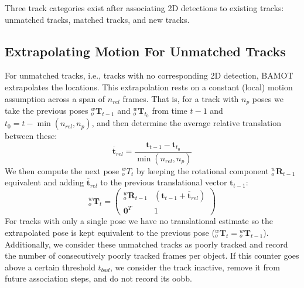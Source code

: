 \documentclass[headsepline, hidelinks, footsepline, footinclude=false, oneside, fontsize=11pt, paper=a4, listof=totoc, bibliography=totoc]{scrbook}
\begin{document}
Three track categories exist after associating 2D detections to existing tracks: unmatched tracks, matched tracks, and new tracks.

\subsection{Extrapolating Motion For Unmatched Tracks}
\label{sec:org9bb640c}
    For unmatched tracks, i.e., tracks with no corresponding 2D detection, BAMOT extrapolates the locations. This extrapolation rests on a constant (local) motion assumption across a span of \(n_{rel}\) frames.
That is, for a track with \(n_p\) poses we take the previous poses \({}^{w}_{o}\mathbf{T}_{t-1}\) and \({}^{w}_{o}\mathbf{T}_{t_0}\) from time \(t - 1\) and \(t_0 = t - \min(n_{rel}, n_p)\), and then determine the average relative translation between these:
\begin{equation}
\overline{\mathbf{t}}_{rel} = \frac{\mathbf{t}_{t-1} - \mathbf{t}_{t_0}}{\min(n_{rel}, n_p)}
\end{equation}
We then compute the next pose \({}^{w}_{o}T_t\) by keeping the rotational component \({}^{w}_{o}\mathbf{R}_{t-1}\) equivalent and adding \(\overline{\mathbf{t}}_{rel}\) 
to the previous translational vector \(\mathbf{t}_{t-1}\):
\begin{equation}
{}^{w}_{o}\mathbf{T}_t = \begin{pmatrix}{}^{w}_{o}\mathbf{R}_{t-1} & (\mathbf{t}_{t-1} + \overline{\mathbf{t}}_{rel}) \\ \mathbf{0}^T & 1 \end{pmatrix}
\end{equation}
For tracks with only a single pose we have no translational estimate so the extrapolated pose is kept equivalent to the previous pose (\({}^{w}_{o}\mathbf{T}_t={}^{w}_{o}\mathbf{T}_{t-1}\)).
Additionally, we consider these unmatched tracks as poorly tracked and record the number of consecutively poorly tracked frames per object. If this counter goes above a certain threshold \(t_{bad}\), 
we consider the track inactive, remove it from future association steps, and do not record its \gls{oobb}.
\end{document}
